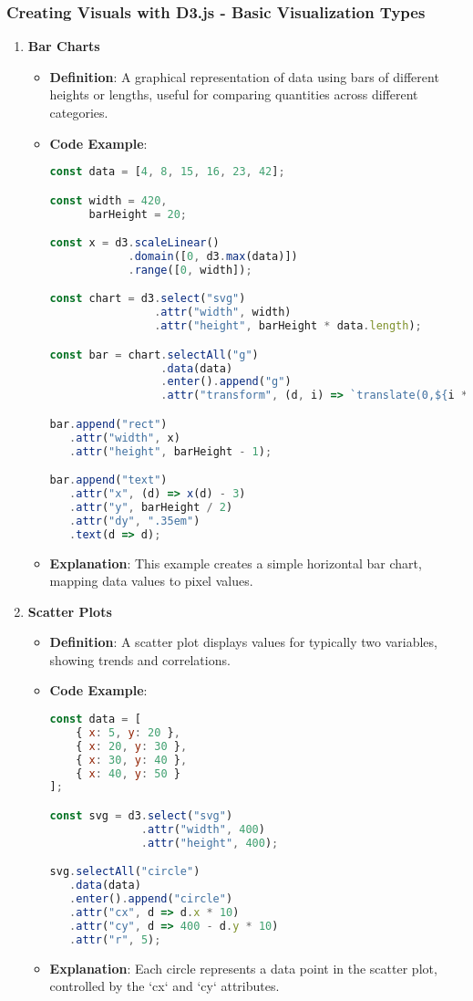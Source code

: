 \documentclass{beamer}
\begin{document}
\begin{frame}[fragile]
    \frametitle{Creating Visuals with D3.js - Basic Visualization Types}
    \begin{enumerate}
        \item \textbf{Bar Charts}
        \begin{itemize}
            \item \textbf{Definition}: A graphical representation of data using bars of different heights or lengths, useful for comparing quantities across different categories.
            \item \textbf{Code Example}:
            \begin{lstlisting}[language=JavaScript]
const data = [4, 8, 15, 16, 23, 42];

const width = 420,
      barHeight = 20;

const x = d3.scaleLinear()
            .domain([0, d3.max(data)])
            .range([0, width]);

const chart = d3.select("svg")
                .attr("width", width)
                .attr("height", barHeight * data.length);

const bar = chart.selectAll("g")
                 .data(data)
                 .enter().append("g")
                 .attr("transform", (d, i) => `translate(0,${i * barHeight})`);

bar.append("rect")
   .attr("width", x)
   .attr("height", barHeight - 1);

bar.append("text")
   .attr("x", (d) => x(d) - 3)
   .attr("y", barHeight / 2)
   .attr("dy", ".35em")
   .text(d => d);
            \end{lstlisting}
            \item \textbf{Explanation}: This example creates a simple horizontal bar chart, mapping data values to pixel values.
        \end{itemize}

        \item \textbf{Scatter Plots}
        \begin{itemize}
            \item \textbf{Definition}: A scatter plot displays values for typically two variables, showing trends and correlations.
            \item \textbf{Code Example}:
            \begin{lstlisting}[language=JavaScript]
const data = [
    { x: 5, y: 20 }, 
    { x: 20, y: 30 }, 
    { x: 30, y: 40 }, 
    { x: 40, y: 50 }
];

const svg = d3.select("svg")
              .attr("width", 400)
              .attr("height", 400);

svg.selectAll("circle")
   .data(data)
   .enter().append("circle")
   .attr("cx", d => d.x * 10)
   .attr("cy", d => 400 - d.y * 10)
   .attr("r", 5);
            \end{lstlisting}
            \item \textbf{Explanation}: Each circle represents a data point in the scatter plot, controlled by the `cx` and `cy` attributes.
        \end{itemize}
    \end{enumerate}
\end{frame}
\end{document}

